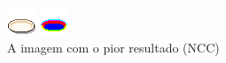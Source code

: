 \begin{figure}[h!]
	\caption{A imagem com o pior resultado (NCC)}
    \label{fig:badncc}
    \centering
    \begin{minipage}[b]{0.25\textwidth}
        \includegraphics[width=\textwidth]{imagens/01_dish.png}
    \end{minipage}
    \hfill
    \begin{minipage}[b]{0.25\textwidth}
        \includegraphics[width=\textwidth]{imagens/01_dish.expected.png}

\end{minipage}
\end{figure}

